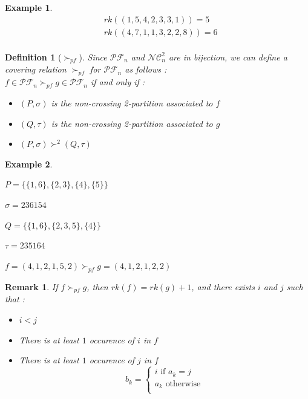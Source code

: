 \documentclass[12pt]{report}
\newtheorem{definition}{Definition}
\newtheorem*{example}{Example}
\newtheorem*{rem}{Remark}
\begin{document}
\begin{example}
    \begin{align*}
        &rk((1, 5, 4, 2, 3, 3, 1)) = 5\\
        &rk((4, 7, 1, 1, 3, 2 ,2, 8)) = 6\\
    \end{align*}
\end{example}

\begin{definition}[$\succ_{pf}$]
    Since $\mathcal{PF}_n$ and $\mathcal{NC}^2_n$ are
    in bijection, we can define a \emph{covering relation}
    $\succ_{pf}$ for $\mathcal{PF}_n$ as follows :\\
    $f \in \mathcal{PF}_n \succ_{pf} g \in \mathcal{PF}_n$
    if and only if :    
    \begin{itemize}
        \item $(P,\sigma)$ is the non-crossing 2-partition
        associated to $f$
        \item $(Q, \tau)$ is the non-crossing 2-partition
        associated to $g$
        \item $(P, \sigma) \succ^2 (Q, \tau)$
    \end{itemize}
\end{definition}

\begin{example}
    ~\\
    \begin{itemize*}
        \item $P = \{\{1, 6\}, \{2, 3\}, \{4\}, \{5\}\}$\\
        \item $\sigma = 236154$\\
        \item $Q = \{\{1, 6\}, \{2, 3, 5\}, \{4\}\}$\\
        \item $\tau = 235164$\\
        \item $f = (4, 1, 2, 1, 5, 2) \succ_{pf}
            g = (4, 1, 2, 1, 2, 2)$\\
    \end{itemize*}
\end{example}

\begin{rem}
    If $f \succ_{pf} g$, then $rk(f) = rk(g) + 1$, and
    there exists $i$ and $j$ such that :
    \begin{itemize}
        \item $i < j$
        \item There is at least $1$ occurence of $i$ in $f$
        \item There is at least $1$ occurence of $j$ in $f$
        $$b_k =
            \begin{cases}
                i \text{ if } a_k = j\\
                a_k \text{ otherwise}\\
            \end{cases}$$
    \end{itemize}
\end{rem}
\end{document}
